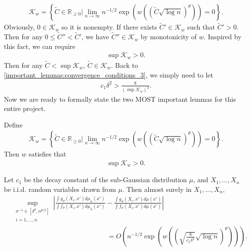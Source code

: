 \documentclass[10pt]{article}
\begin{document}
\begin{align}
  \mathcal{K}_w = \left\{\tilde{C} \in \mathbb{R}_{\geq 0} \bigg\rvert \lim_{n \to \infty} n^{-1/2} \exp \left(w\left(\left(\tilde{C} \sqrt{\log n} \right)^{\theta} \right) \right) = 0 \right\}.
\end{align}
Obviously, $0 \in \mathcal{K}_w$ so it is nonempty. If there exists $\tilde{C}'\in \mathcal{K}_w$ such that $\tilde{C}' >0$. Then for any $0 \leq \tilde{C}'' < \tilde{C}'$, we have $\tilde{C}'' \in \mathcal{K}_w$ by monotonicity of $w$. Inspired by this fact, we can require
\begin{align}
  \sup \mathcal{K}_w > 0.
\end{align}
Then for any $\tilde{C} < \sup \mathcal{K}_w$, $\tilde{C} \in \mathcal{K}_w$. Back to \eqref{important_lemmas:convergence_conditions_3}, we simply need to let
\begin{align}
  c_1\delta^2 > \frac{8}{(\sup \mathcal{K}_w)^2}.
\end{align}
Now we are ready to formally state the two MOST important lemmas for this entire project.
\begin{condition} \label{important_lemmas:convergence_conditions}
  Define
  \begin{align}
    \mathcal{K}_w = \left\{\tilde{C} \in \mathbb{R}_{\geq 0} \bigg\rvert \lim_{n \to \infty} n^{-1/2} \exp \left(w\left(\left(\tilde{C} \sqrt{\log n} \right)^{\theta} \right) \right) = 0 \right\}.
  \end{align}
  Then $w$ satisfies that
  \begin{align}
    \sup \mathcal{K}_w > 0.
  \end{align}
\end{condition}
\begin{lemma}
  Let $c_1$ be the decay constant of the sub-Gaussian distribution $\mu$, and $X_1,\dots,X_n$ be i.i.d. random variables drawn from $\mu$. Then almost surely in $X_1,\dots,X_n$,
  \begin{align}
     & \sup_{\substack{\sigma^{-1} \in [\delta^{\theta},n^{\theta/2}]                                                                                                               \\ i = 1,\dots, n}} \left|\frac{\int g_{\sigma}(X_i,x') d\mu_n(x')}{\int f_{\sigma}(X_i,x') d\mu_n(x')}-\frac{\int g_{\sigma}(X_i,x') d\mu(x')}{\int f_{\sigma}(X_i,x') d\mu(x')}\right| \nonumber \\
     & \qquad \qquad \qquad \qquad \qquad \qquad \qquad= O\left(n^{-1/2} \exp \left(w\left(\left(\sqrt{\frac{8}{c_1\delta^2}}\sqrt{\log n} \right)^{\theta} \right) \right)\right).
  \end{align}
\end{lemma}
\end{document}
